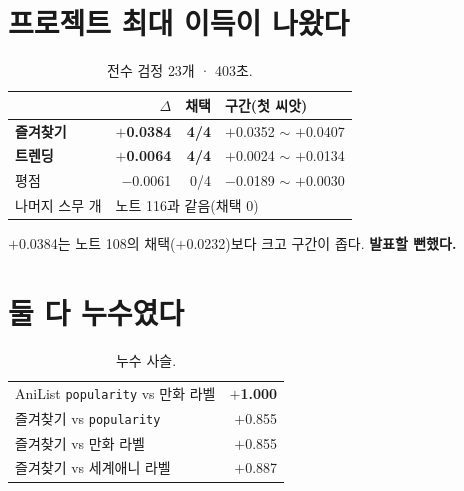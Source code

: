 \documentclass[10pt]{article}
\begin{document}
\section{프로젝트 최대 이득이 나왔다}

\begin{table}[t]
\centering\tsize
\caption{전수 검정 23개 · 403초.}
\begin{tabular}{lrrl}
\toprule
& $\Delta$ & 채택 & 구간(첫 씨앗) \\
\midrule
\textbf{즐겨찾기} & \textbf{$+$0.0384} & \textbf{4/4} &
$+$0.0352 $\sim$ $+$0.0407 \\
\textbf{트렌딩} & \textbf{$+$0.0064} & \textbf{4/4} &
$+$0.0024 $\sim$ $+$0.0134 \\
\midrule
평점 & $-$0.0061 & 0/4 & $-$0.0189 $\sim$ $+$0.0030 \\
나머지 스무 개 & \multicolumn{3}{l}{노트 116과 같음(채택 0)} \\
\bottomrule
\end{tabular}
\end{table}

$+$0.0384는 노트 108의 채택($+$0.0232)보다 크고 구간이 좁다. \textbf{발표할
뻔했다.}

\section{둘 다 누수였다}

\begin{table}[t]
\centering\tsize
\caption{누수 사슬.}
\begin{tabular}{lr}
\toprule
AniList \texttt{popularity} vs 만화 라벨 & \textbf{$+$1.000} \\
즐겨찾기 vs \texttt{popularity} & $+$0.855 \\
\midrule
즐겨찾기 vs 만화 라벨 & $+$0.855 \\
즐겨찾기 vs 세계애니 라벨 & $+$0.887 \\
\bottomrule
\end{tabular}
\end{table}

\end{document}
